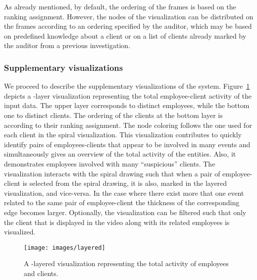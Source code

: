 \documentclass[conference]{IEEEtran}
\begin{document}
As already mentioned, by default, the ordering of the frames is
based on the ranking assignment. However, the nodes of the
visualization can be distributed on the frames according to an
ordering specified by the auditor, which may be based on predefined
knowledge about a client or on a list of clients already marked by
the auditor from a previous investigation.

\subsubsection{Supplementary visualizations}

We proceed to describe the supplementary visualizations of the
system. Figure~\ref{fig:layered} depicts a -layer visualization
representing the total employee-client activity of the input data.
The upper layer corresponds to distinct employees, while the bottom
one to distinct clients. The ordering of the clients at the bottom
layer is according to their ranking assignment. The node coloring
follows the one used for each client in the spiral visualization.
This visualization contributes to quickly identify pairs of
employees-clients that appear to be involved in many events and
simultaneously gives an overview of the total activity of the
entities. Also, it demonstrates employees involved with many
``suspicious'' clients. The visualization interacts with the spiral
drawing such that when a pair of employee-client is selected from
the spiral drawing, it is also, marked in the layered visualization,
and vice-versa. In the case where there exist more that one event
related to the same pair of employee-client the thickness of the
corresponding edge becomes larger. Optionally, the visualization can
be filtered such that only the client that is displayed in the video
along with its related employees is visualized.

\begin{figure}[h!tb]
  \texttt{[image: images/layered]}
  \caption{A -layered visualization representing the total activity of employees and clients.}
  \label{fig:layered}
\end{figure}
\end{document}
